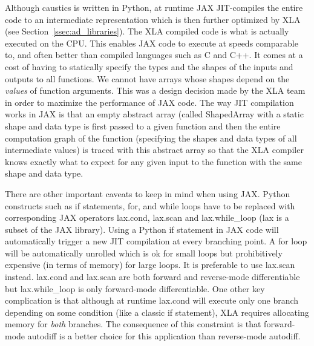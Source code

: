 \documentclass[12pt,dvipsnames]{report}
\newcommand{\ssf}[1]{\textsf{#1}}
\begin{document}
Although \ssf{caustics} is written in \ssf{Python}, at runtime JAX JIT-compiles 
the entire code to an intermediate representation which is then
further optimized by \ssf{XLA} (see Section~\ref{ssec:ad_libraries}). The XLA 
compiled code is what is actually executed on the CPU. 
This enables \ssf{JAX} code to execute at speeds comparable to, and often better 
than compiled
languages such as \ssf{C} and \ssf{C++}. It comes at a cost of having to
statically specify the types and the shapes of the inputs and outputs to all
functions. We cannot have arrays whose shapes depend on the \emph{values}
of function arguments. This was a design decision made by the \ssf{XLA} team in
order to maximize the performance of \ssf{JAX} code. The way JIT compilation
works in \ssf{JAX} is that an empty abstract array (called \ssf{ShapedArray} with a static shape and 
data type is first passed to a given function and then
the entire computation graph of the function (specifying the shapes and data
types of all intermediate values) is traced with this abstract array so that the XLA
compiler knows exactly what to expect for any given input to the function with
the same shape and data type.

There are other important caveats to keep in mind when using \ssf{JAX}.
\ssf{Python}
constructs such as \ssf{if} statements, \ssf{for}, and \ssf{while} loops have
to be replaced with corresponding \ssf{JAX} operators \ssf{lax.cond},
\ssf{lax.scan} and \ssf{lax.while\_loop} (\ssf{lax} is a subset of the
\ssf{JAX} library). Using a \ssf{Python} \ssf{if} statement in \ssf{JAX} code will automatically
trigger a new JIT compilation at every branching point. A \ssf{for} loop will
be automatically unrolled which is ok for small loops but prohibitively
expensive (in terms of memory) for large loops. It is preferable to use
\ssf{lax.scan} instead. \ssf{lax.cond} and \ssf{lax.scan} are both forward and
reverse-mode differentiable but \ssf{lax.while\_loop} is only forward-mode
differentiable. One other key complication is that although at runtime
\ssf{lax.cond} will execute only one branch depending on some condition (like a
classic \ssf{if} statement), XLA requires allocating memory for \emph{both}
branches. The consequence of this constraint is that forward-mode autodiff is a better
choice for this application than reverse-mode autodiff.
\end{document}

